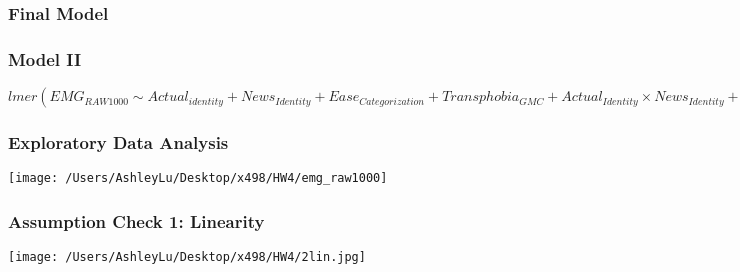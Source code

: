\documentclass{beamer}
\begin{document}
\frame
{
\frametitle{Final Model}


}

\frame
{
\frametitle{Model II}

$lmer(EMG_{RAW1000} \sim Actual_{identity} + News_{Identity} + Ease_{Categorization} + Transphobia_{GMC}+Actual_{Identity} \times News_{Identity}+Actual_{Identity} \times Ease_{Categorization}+Actual_{Identity} \times Transphobia_{GMC}+News_{identity} \times Ease_{Categorization}+News_{Identity} \times Transphobia_{GMC}+Ease_{Categorization} \times Transphobia_{GMC}+(1|Participant),data=GLRB)$
}

\frame
{
\frametitle{Exploratory Data Analysis}
\begin{center}
\texttt{[image: /Users/AshleyLu/Desktop/x498/HW4/emg\_raw1000]}		
\end{center}
}


\frame
{
\frametitle{Assumption Check 1: Linearity}
\begin{center}
\texttt{[image: /Users/AshleyLu/Desktop/x498/HW4/2lin.jpg]}	
\end{center}


}
\end{document}
